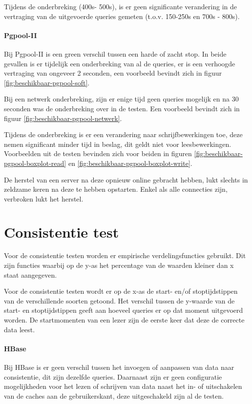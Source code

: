 Tijdens de onderbreking (400s- 500s), is er geen significante verandering in de vertraging van de uitgevoerde queries gemeten (t.o.v. 150-250s en 700s - 800s). 
 


\paragraph{Pgpool-II} Bij Pgpool-II is een green verschil tussen een harde of zacht stop. In beide gevallen is er tijdelijk een onderbreking van al de queries, er is een verhoogde vertraging van ongeveer 2 seconden, een voorbeeld bevindt zich in figuur \ref{fig:beschikbaar-pgpool-soft}. 

Bij een netwerk onderbreking, zijn er enige tijd geen queries mogelijk en na 30 seconden was de onderbreking over in de testen. Een voorbeeld bevindt zich in figuur \ref{fig:beschikbaar-pgpool-netwerk}.  

Tijdens de onderbreking is er een verandering naar schrijfbewerkingen toe, deze nemen significant minder tijd in beslag, dit geldt niet voor leesbewerkingen. Voorbeelden uit de testen bevinden zich voor beiden in figuren \ref{fig:beschikbaar-pgpool-boxplot-read} en \ref{fig:beschikbaar-pgpool-boxplot-write}. 

De herstel van een server na deze opnieuw online gebracht hebben, lukt slechts in zeldzame keren na deze te hebben opstarten. Enkel als alle connecties zijn, verbroken lukt het herstel. 

\section{Consistentie test}
Voor de consistentie testen worden er empirische verdelingsfuncties gebruikt. Dit zijn functies waarbij op de y-as het percentage van de waarden kleiner dan x staat aangegeven.

Voor de consistentie testen wordt er op de x-as de start- en/of stoptijdstippen van de verschillende soorten getoond. Het verschil tussen de y-waarde van de start- en stoptijdstippen geeft aan hoeveel queries er op dat moment uitgevoerd worden. De startmomenten van een lezer zijn de eerste keer dat deze de correcte data leest. 

\paragraph{HBase}
Bij HBase is er geen verschil tussen het invoegen of aanpassen van data naar consistentie, dit zijn dezelfde queries. Daarnaast zijn er geen configuratie mogelijkheden voor het lezen of schrijven van data naast het in- of uitschakelen van de caches aan de gebruikerskant, deze uitgeschakeld zijn al de testen. 

